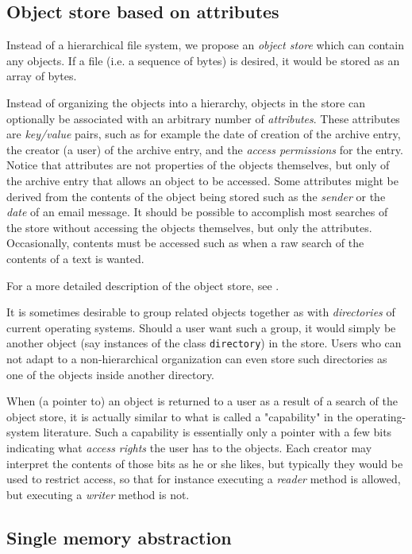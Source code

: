 \subsection{Object store based on attributes}

Instead of a hierarchical file system, we propose an \emph{object
  store} which can contain any objects.  If a file (i.e. a
sequence of bytes) is desired, it would be stored as an array of
bytes.

Instead of organizing the objects into a hierarchy, objects in the
store can optionally be associated with an arbitrary number
of \emph{attributes}.  These attributes are \emph{key/value} pairs, such as for
example the date of creation of the archive entry, the creator (a
user) of the archive entry, and the \emph{access permissions} for
the entry.  Notice that attributes are not properties of the objects
themselves, but only of the archive entry that allows an object to
be accessed.  Some attributes might be derived from the contents of the
object being stored such as the \emph{sender} or the \emph{date} of
an email message.  It should be possible to accomplish most searches
of the store without accessing the objects themselves, but only the
attributes.  Occasionally, contents must be accessed such as when a raw
search of the contents of a text is wanted. 

For a more detailed description of the object store, see
. 

It is sometimes desirable to group related objects together as
with \emph{directories} of current operating systems.  Should a user
want such a group, it would simply be another object (say instances
of the class \texttt{directory}) in the store.  Users who can not
adapt to a non-hierarchical organization can even store such
directories as one of the objects inside another directory.

When (a pointer to) an object is returned to a user as a result of a
search of the object store, it is actually similar to what is called
a "capability" in the operating-system literature.  Such a
capability is essentially only a pointer with a few bits indicating
what \emph{access rights} the user has to the objects.  Each creator
may interpret the contents of those bits as he or she likes, but
typically they would be used to restrict access, so that for
instance executing a \emph{reader} method is allowed, but executing
a \emph{writer} method is not.

\subsection{Single memory abstraction}

